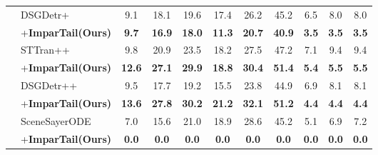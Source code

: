 \begin{table}[!h]
{\begin{tabular}{l|l|ccccccccc}
          \cmidrule(lr){3-11} 
        &        DSGDetr+~\cite{peddi_et_al_scene_sayer_2024} & 9.1 & 18.1 & 19.6 & 17.4 & 26.2 & 45.2 & 6.5 & 8.0 & 8.0  \\ 
        &        \quad+\textbf{ImparTail(Ours)} & \cellcolor{highlightColor} \textbf{9.7} & \cellcolor{highlightColor} \textbf{16.9} & \cellcolor{highlightColor} \textbf{18.0} & \cellcolor{highlightColor} \textbf{11.3} & \cellcolor{highlightColor} \textbf{20.7} & \cellcolor{highlightColor} \textbf{40.9} & \cellcolor{highlightColor} \textbf{3.5} & \cellcolor{highlightColor} \textbf{3.5} & \cellcolor{highlightColor} \textbf{3.5}  \\ 
          \cmidrule(lr){3-11} 
        &        STTran++~\cite{peddi_et_al_scene_sayer_2024} & 9.8 & 20.9 & 23.5 & 18.2 & 27.5 & 47.2 & 7.1 & 9.4 & 9.4  \\ 
        &        \quad+\textbf{ImparTail(Ours)} & \cellcolor{highlightColor} \textbf{12.6} & \cellcolor{highlightColor} \textbf{27.1} & \cellcolor{highlightColor} \textbf{29.9} & \cellcolor{highlightColor} \textbf{18.8} & \cellcolor{highlightColor} \textbf{30.4} & \cellcolor{highlightColor} \textbf{51.4} & \cellcolor{highlightColor} \textbf{5.4} & \cellcolor{highlightColor} \textbf{5.5} & \cellcolor{highlightColor} \textbf{5.5}  \\ 
          \cmidrule(lr){3-11} 
        &        DSGDetr++~\cite{peddi_et_al_scene_sayer_2024} & 9.5 & 17.7 & 19.2 & 15.5 & 23.8 & 44.9 & 6.9 & 8.1 & 8.1  \\ 
        &        \quad+\textbf{ImparTail(Ours)} & \cellcolor{highlightColor} \textbf{13.6} & \cellcolor{highlightColor} \textbf{27.8} & \cellcolor{highlightColor} \textbf{30.2} & \cellcolor{highlightColor} \textbf{21.2} & \cellcolor{highlightColor} \textbf{32.1} & \cellcolor{highlightColor} \textbf{51.2} & \cellcolor{highlightColor} \textbf{4.4} & \cellcolor{highlightColor} \textbf{4.4} & \cellcolor{highlightColor} \textbf{4.4}  \\ 
          \cmidrule(lr){3-11} 
        &        SceneSayerODE~\cite{peddi_et_al_scene_sayer_2024} & 7.0 & 15.6 & 21.0 & 18.9 & 28.6 & 45.2 & 5.1 & 6.9 & 7.2  \\ 
        &        \quad+\textbf{ImparTail(Ours)} & \cellcolor{highlightColor} \textbf{0.0} & \cellcolor{highlightColor} \textbf{0.0} & \cellcolor{highlightColor} \textbf{0.0} & \cellcolor{highlightColor} \textbf{0.0} & \cellcolor{highlightColor} \textbf{0.0} & \cellcolor{highlightColor} \textbf{0.0} & \cellcolor{highlightColor} \textbf{0.0} & \cellcolor{highlightColor} \textbf{0.0} & \cellcolor{highlightColor} \textbf{0.0}  \\ 

\end{tabular}}
\end{table}
